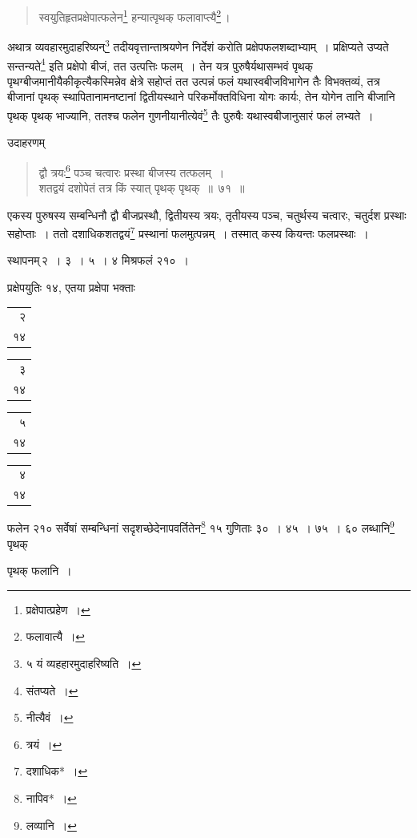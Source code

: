 \documentclass[10pt, openany]{book}
\begin{document}
{{ \label{59.1}
\begin{quote}
{\bs स्वयुतिहृतप्रक्षेपात्फलेन\renewcommand{\thefootnote}{\s १२}\footnote{\s प्रक्षेपात्प्रहेण~।}  हन्यात्पृथक् फलावाप्त्यै\renewcommand{\thefootnote}{\s १३}\footnote{\s फलावात्यै~।}\,।}
\end{quote}

{अथात्र व्यवहारमुदाहरिष्यन्\renewcommand{\thefootnote}{\s १४}\footnote{\s ५ यं व्यहहारमुदाहरिष्यति~।}  तदीयवृत्तान्ताश्रयणेन निर्देशं करोति
प्रक्षेपफलशब्दाभ्याम्~। प्रक्षिप्यते उप्यते सन्तन्यते\renewcommand{\thefootnote}{\s १५}\footnote{\s संतप्यते~।}  इति प्रक्षेपो बीजं,
तत उत्पत्तिः फलम्~। तेन यत्र}
{पुरुषैर्यथासम्भवं पृथक् पृथग्बीजमानीयैकीकृत्यैकस्मिन्नेव क्षेत्रे
सहोप्तं तत उत्पन्नं फलं}
{यथास्वबीजविभागेन तैः विभक्तव्यं, तत्र बीजानां पृथक् स्थापितानामनष्टानां
द्वितीयस्थाने}
{परिकर्मोक्तविधिना योगः कार्यः, तेन योगेन तानि बीजानि पृथक् पृथक्
भाज्यानि, ततश्च}
{फलेन गुणनीयानीत्येवं\renewcommand{\thefootnote}{\s १६}\footnote{\s *नीत्यैवं~।}  तैः पुरुषैः यथास्वबीजानुसारं फलं लभ्यते~।}

\vspace{3mm}
{उदाहरणम्\textemdash}

\begin{quote}

{\eg  द्वौ त्रयः\renewcommand{\thefootnote}{\s १७}\footnote{\s त्रयं~।}  पञ्च चत्वारः प्रस्था बीजस्य तत्फलम्~। \\
 शतद्वयं दशोपेतं तत्र किं स्यात् पृथक् पृथक्~॥~७१~॥}
\end{quote}

{एकस्य पुरुषस्य सम्बन्धिनौ द्वौ बीजप्रस्थौ, द्वितीयस्य त्रयः, तृतीयस्य
पञ्च, चतुर्थस्य}
{चत्वारः, चतुर्दश प्रस्थाः सहोप्ताः~। ततो दशाधिकशतद्वयं\renewcommand{\thefootnote}{\s १८}\footnote{\s दशाधिक*~।}  प्रस्थानां
फलमुत्पन्नम्~। तस्मात्}
{कस्य कियन्तः फलप्रस्थाः~।}
\vspace{2mm}

{स्थापनम्\textendash \,२~। ३~। ५~। ४ मिश्रफलं २१०~।}


\newpage

{प्रक्षेपयुतिः १४, एतया प्रक्षेपा भक्ताः\begin{tabular}{r|}२\\ १४\end{tabular}\begin{tabular}{r|}३\\ १४\end{tabular}\begin{tabular}{r|}५\\ १४\end{tabular}\begin{tabular}{r} ४ \\ १४\end{tabular}फलेन २१० सर्वेषां सम्बन्धिनां सदृशच्छेदेनापवर्तितेन\renewcommand{\thefootnote}{\s १}\footnote{\s *नापिव*~।}  १५ गुणिताः ३०~।
४५~। ७५~। ६० लब्धानि\renewcommand{\thefootnote}{\s २}\footnote{\s लव्यानि~।} पृथक्}
{पृथक् फलानि~।}
\vspace{3mm}

}}
\end{document}
